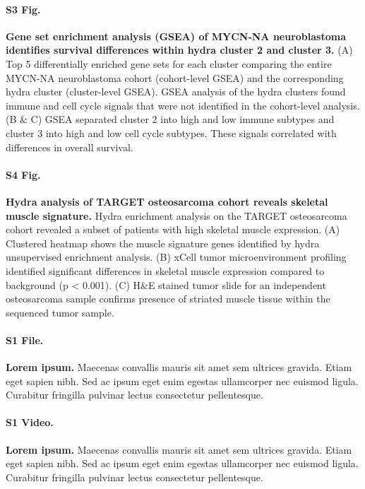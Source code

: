 \documentclass[10pt,letterpaper]{article}
\begin{document}
\paragraph*{S3 Fig.}
\label{S3_Fig} {\bf Gene set enrichment analysis (GSEA) of MYCN-NA neuroblastoma identifies survival differences within hydra cluster 2 and cluster 3.} (A) Top 5 differentially enriched gene sets for each cluster comparing the entire MYCN-NA neuroblastoma cohort (cohort-level GSEA) and the corresponding hydra cluster (cluster-level GSEA). GSEA analysis of the hydra clusters found immune and cell cycle signals that were not identified in the cohort-level analysis. (B \& C) GSEA separated cluster 2 into high and low immune subtypes and cluster 3 into high and low cell cycle subtypes. These signals correlated with differences in overall survival. 

\paragraph*{S4 Fig.}
\label{S4_Fig} {\bf Hydra analysis of TARGET osteosarcoma cohort reveals skeletal muscle signature.} Hydra enrichment analysis on the TARGET osteosarcoma cohort revealed a subset of patients with high skeletal muscle expression. (A) Clustered heatmap shows the muscle signature genes identified by hydra unsupervised enrichment analysis. (B) xCell tumor microenvironment profiling identified significant differences in skeletal muscle expression compared to background (p < 0.001). (C) H\&E stained tumor slide for an independent osteosarcoma sample confirms presence of striated muscle tissue within the sequenced tumor sample.

\paragraph*{S1 File.}
\label{S1_File}
{\bf Lorem ipsum.}  Maecenas convallis mauris sit amet sem ultrices gravida. Etiam eget sapien nibh. Sed ac ipsum eget enim egestas ullamcorper nec euismod ligula. Curabitur fringilla pulvinar lectus consectetur pellentesque.

\paragraph*{S1 Video.}
\label{S1_Video}
{\bf Lorem ipsum.}  Maecenas convallis mauris sit amet sem ultrices gravida. Etiam eget sapien nibh. Sed ac ipsum eget enim egestas ullamcorper nec euismod ligula. Curabitur fringilla pulvinar lectus consectetur pellentesque.
\end{document}
